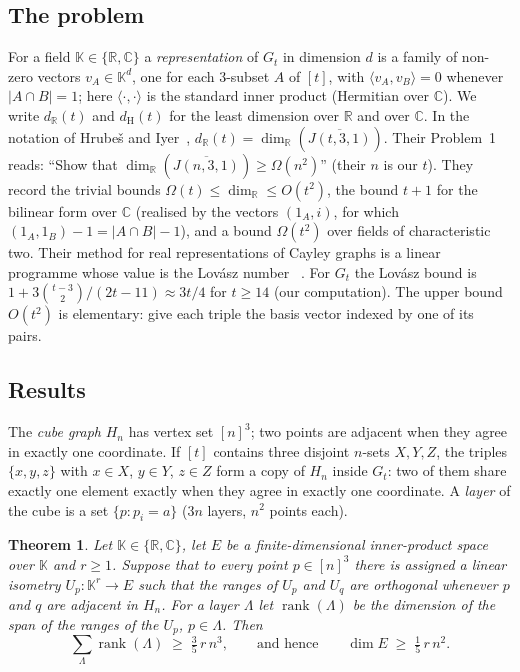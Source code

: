 \documentclass[11pt]{article}
\newtheorem{theorem}{Theorem}
\theoremstyle{remark}
\newcommand{\R}{\mathbb{R}}
\newcommand{\C}{\mathbb{C}}
\newcommand{\K}{\mathbb{K}}
\newcommand{\ip}[2]{\langle #1,#2\rangle}
\newcommand{\rank}{\operatorname{rank}}
\newcommand{\Gt}{G_t}
\newcommand{\Hn}{H_n}
\begin{document}
\subsection{The problem}
For a field $\K\in\{\R,\C\}$ a \emph{representation} of $\Gt$ in dimension $d$ is a family of non-zero vectors
$v_A\in\K^d$, one for each $3$-subset $A$ of $[t]$, with $\ip{v_A}{v_B}=0$ whenever $|A\cap B|=1$; here
$\ip{\cdot}{\cdot}$ is the standard inner product (Hermitian over $\C$). We write $d_\R(t)$ and $d_{\mathrm H}(t)$
for the least dimension over $\R$ and over $\C$. In the notation of Hrube\v{s} and Iyer~\cite{HI},
$d_\R(t)=\dim_\R(\overline{J(t,3,1)})$. Their Problem~1 reads: ``Show that
$\dim_\R(\overline{J(n,3,1)})\ge\Omega(n^2)$'' (their $n$ is our $t$). They record the trivial bounds
$\Omega(t)\le\dim_\R\le O(t^2)$, the bound $t+1$ for the bilinear form over $\C$ (realised by the vectors
$(1_A,i)$, for which $(1_A,1_B)-1=|A\cap B|-1$), and a bound $\Omega(t^2)$ over fields of characteristic two.
Their method for real representations of Cayley graphs is a linear programme whose value is the Lov\'asz
number~\cite{Lo} \cite[Lemma~22 and~(8)]{HI}. For $\Gt$ the Lov\'asz bound is
$1+3\binom{t-3}2/(2t-11)\approx 3t/4$ for $t\ge14$ (our computation). The upper bound $O(t^2)$ is elementary: give each triple the basis vector indexed by one
of its pairs.

\subsection{Results}
The \emph{cube graph} $\Hn$ has vertex set $[n]^3$; two points are adjacent when they agree in exactly one
coordinate. If $[t]$ contains three disjoint $n$-sets $X,Y,Z$, the triples $\{x,y,z\}$ with $x\in X$, $y\in Y$,
$z\in Z$ form a copy of $\Hn$ inside $\Gt$: two of them share exactly one element exactly when they agree in
exactly one coordinate. A \emph{layer} of the cube is a set $\{p: p_i=a\}$ ($3n$ layers, $n^2$ points each).

\begin{theorem}\label{thm:L}
Let $\K\in\{\R,\C\}$, let $E$ be a finite-dimensional inner-product space over $\K$ and $r\ge1$. Suppose that
to every point $p\in[n]^3$ there is assigned a linear isometry $U_p\colon\K^r\to E$ such that the ranges of
$U_p$ and $U_q$ are orthogonal whenever $p$ and $q$ are adjacent in $\Hn$. For a layer $\Lambda$ let
$\rank(\Lambda)$ be the dimension of the span of the ranges of the $U_p$, $p\in\Lambda$. Then
\[ \sum_{\Lambda}\rank(\Lambda)\;\ge\;\tfrac35\,r\,n^3 ,\qquad\text{and hence}\qquad
   \dim E\;\ge\;\tfrac15\,r\,n^2 . \]
\end{theorem}
\end{document}

